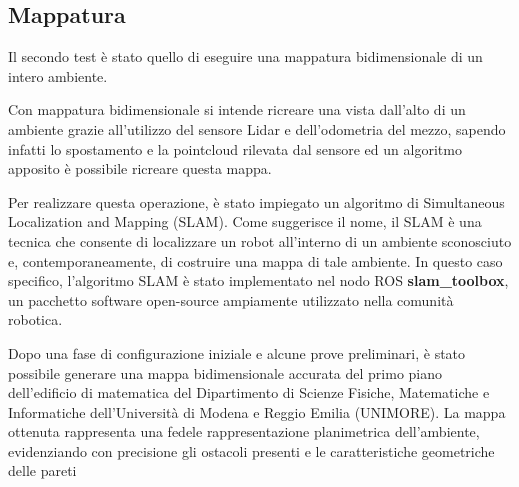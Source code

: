 \subsection{Mappatura}
Il secondo test è stato quello di eseguire una mappatura bidimensionale di un intero ambiente.

\noindent Con mappatura bidimensionale si intende ricreare una vista dall'alto di un ambiente grazie all'utilizzo del sensore Lidar e dell'odometria del mezzo, sapendo infatti lo spostamento e la pointcloud rilevata dal sensore ed un algoritmo apposito è possibile ricreare questa mappa.

\noindent Per realizzare questa operazione, è stato impiegato un algoritmo di Simultaneous Localization and Mapping (SLAM). Come suggerisce il nome, il SLAM è una tecnica che consente di localizzare un robot all'interno di un ambiente sconosciuto e, contemporaneamente, di costruire una mappa di tale ambiente. In questo caso specifico, l'algoritmo SLAM è stato implementato nel nodo ROS \textbf{slam\_toolbox}, un pacchetto software open-source ampiamente utilizzato nella comunità robotica.

\noindent Dopo una fase di configurazione iniziale e alcune prove preliminari, è stato possibile generare una mappa bidimensionale accurata del primo piano dell'edificio di matematica del Dipartimento di Scienze Fisiche, Matematiche e Informatiche dell'Università di Modena e Reggio Emilia (UNIMORE). La mappa ottenuta rappresenta una fedele rappresentazione planimetrica dell'ambiente, evidenziando con precisione gli ostacoli presenti e le caratteristiche geometriche delle pareti

